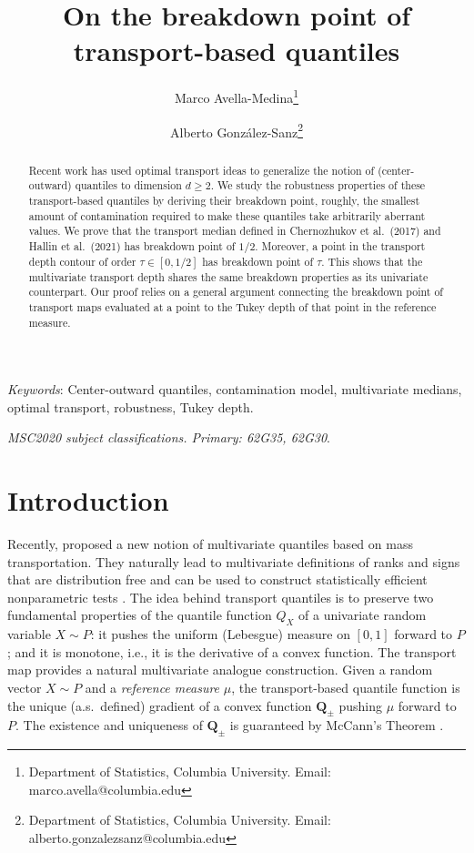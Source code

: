 \documentclass[11pt]{article}
\theoremstyle{plain}
\theoremstyle{definition}
\begin{document}
\title{On the breakdown point of transport-based quantiles}
%
\author{Marco Avella-Medina\thanks{Department of Statistics, Columbia University. Email: marco.avella@columbia.edu} \and Alberto González-Sanz\thanks{Department of Statistics, Columbia University. Email: alberto.gonzalezsanz@columbia.edu}}
\date{}
\maketitle



\begin{abstract}
Recent work has used optimal transport ideas to generalize the notion of (center-outward) quantiles to dimension $d\geq 2$. We study the robustness properties of these transport-based quantiles by deriving their breakdown point, roughly, the smallest amount of contamination required  to make these quantiles take arbitrarily aberrant values. We prove  that the  transport median defined in Chernozhukov et al.~(2017) and Hallin et al.~(2021)
has breakdown point of $1/2$. Moreover,  a point in the  transport depth contour of order $\tau\in [0,1/2]$ has breakdown point of $\tau$. This shows  that  the multivariate transport depth shares the same breakdown properties as its univariate counterpart. Our proof relies on a general argument connecting the breakdown point of transport maps evaluated at a point to the  Tukey depth of that point in the reference measure. 
\end{abstract}

\noindent \textit{Keywords}: Center-outward quantiles,  contamination model, multivariate medians,  optimal transport, robustness, Tukey depth.

\noindent \textit{MSC2020 subject classifications. Primary: 62G35, 62G30}.


\section{Introduction}
 
Recently, \cite{ChernozhukovEtAl.17.AOS,HallinDelBarrioCuestaAlbertosMatran.21} proposed a new notion of multivariate quantiles based on mass transportation.  They naturally lead to multivariate definitions of ranks and signs  that are distribution free and can be used to construct  statistically efficient nonparametric tests \cite{HallinDelBarrioCuestaAlbertosMatran.21, DebSen.19, Shietal.2022,deb:bhattacharya:sen2025}.  The idea behind transport quantiles is to preserve two fundamental properties of the quantile function \( Q_X \) of a univariate random variable \( X\sim P \):  it pushes the uniform (Lebesgue) measure on $[0,1]$ forward to $P$; and it is monotone, i.e., it is the derivative of a convex function. The transport map  provides a  natural multivariate analogue construction. Given a random vector \( X \sim P \) and a {\it reference  measure} \( \mu \), the transport-based quantile function is the unique (a.s.\ defined) gradient of a convex function \( \mathbf{Q}_{\pm} \) pushing $\mu$ forward to $P$. The existence and uniqueness of $\mathbf{Q}_{\pm}$ is guaranteed by McCann's Theorem \cite{McCann.95}.  
\end{document}
